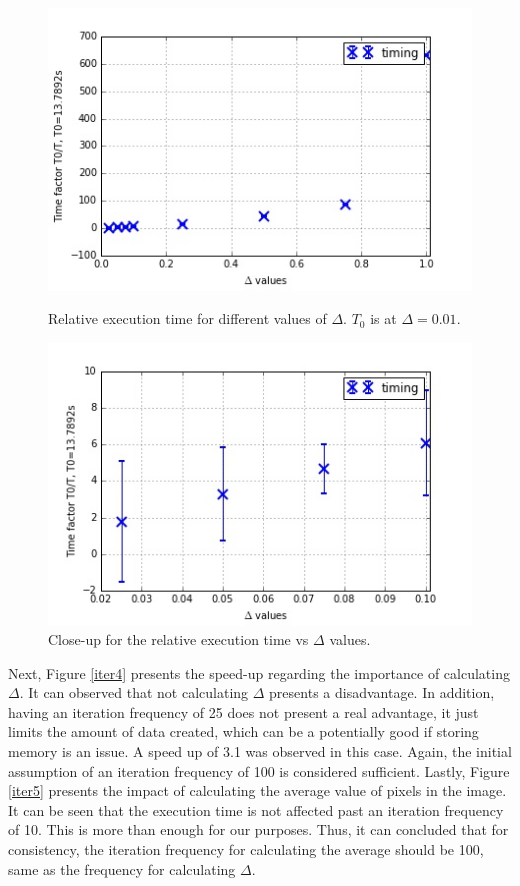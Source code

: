 \documentclass[11pt]{article}
\begin{document}
	\begin{figure}[H]	
		\centering
		\begin{minipage}[b]{.5\textwidth}
			\centering
			\includegraphics[width=\linewidth]{itervs3.jpeg}
			\caption{Relative execution time for different values of $\Delta$. $T_0$ is at $\Delta=0.01$.}\label{iter3}
		\end{minipage}%
		\begin{minipage}[b]{.5\textwidth}
			\centering
			\includegraphics[width=\linewidth]{itervs32.jpeg}
			\caption{Close-up for the relative execution time vs $\Delta$ values.}\label{iter32}
		\end{minipage}
	\end{figure}
	
	Next, Figure \ref{iter4} presents the speed-up regarding the importance of calculating $\Delta$. It can observed that not calculating $\Delta$ presents a disadvantage. In addition, having an iteration frequency of 25 does not present a real advantage, it just limits the amount of data created, which can be a potentially good if storing memory is an issue. A speed up of 3.1 was observed in this case. Again, the initial assumption of an iteration frequency of 100 is considered sufficient. Lastly, Figure \ref{iter5} presents the impact of calculating the average value of pixels in the image. It can be seen that the execution time is not affected past an iteration frequency of 10. This is more than enough for our purposes. Thus, it can concluded that for consistency, the iteration frequency for calculating the average should be 100, same as the frequency for calculating $\Delta$. 
	
\end{document}

